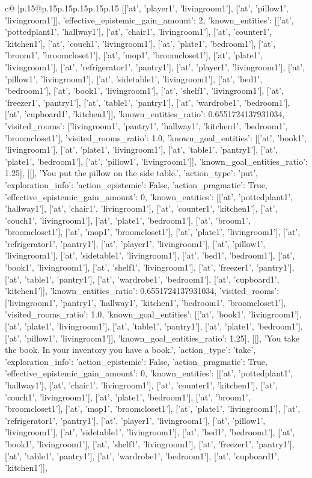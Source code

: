 \documentclass{article}
\begin{document}
{\begin{supertabular}{c@{$\;$}|p{.15\linewidth}@{}p{.15\linewidth}p{.15\linewidth}p{.15\linewidth}p{.15\linewidth}p{.15\linewidth}}
{{{[['at', 'player1', 'livingroom1'], ['at', 'pillow1', 'livingroom1']], 'effective_epistemic_gain_amount': 2, 'known_entities': [['at', 'pottedplant1', 'hallway1'], ['at', 'chair1', 'livingroom1'], ['at', 'counter1', 'kitchen1'], ['at', 'couch1', 'livingroom1'], ['at', 'plate1', 'bedroom1'], ['at', 'broom1', 'broomcloset1'], ['at', 'mop1', 'broomcloset1'], ['at', 'plate1', 'livingroom1'], ['at', 'refrigerator1', 'pantry1'], ['at', 'player1', 'livingroom1'], ['at', 'pillow1', 'livingroom1'], ['at', 'sidetable1', 'livingroom1'], ['at', 'bed1', 'bedroom1'], ['at', 'book1', 'livingroom1'], ['at', 'shelf1', 'livingroom1'], ['at', 'freezer1', 'pantry1'], ['at', 'table1', 'pantry1'], ['at', 'wardrobe1', 'bedroom1'], ['at', 'cupboard1', 'kitchen1']], 'known_entities_ratio': 0.6551724137931034, 'visited_rooms': ['livingroom1', 'pantry1', 'hallway1', 'kitchen1', 'bedroom1', 'broomcloset1'], 'visited_rooms_ratio': 1.0, 'known_goal_entities': [['at', 'book1', 'livingroom1'], ['at', 'plate1', 'livingroom1'], ['at', 'table1', 'pantry1'], ['at', 'plate1', 'bedroom1'], ['at', 'pillow1', 'livingroom1']], 'known_goal_entities_ratio': 1.25}}], [[], 'You put the pillow on the side table.', {'action_type': 'put', 'exploration_info': {'action_epistemic': False, 'action_pragmatic': True, 'effective_epistemic_gain_amount': 0, 'known_entities': [['at', 'pottedplant1', 'hallway1'], ['at', 'chair1', 'livingroom1'], ['at', 'counter1', 'kitchen1'], ['at', 'couch1', 'livingroom1'], ['at', 'plate1', 'bedroom1'], ['at', 'broom1', 'broomcloset1'], ['at', 'mop1', 'broomcloset1'], ['at', 'plate1', 'livingroom1'], ['at', 'refrigerator1', 'pantry1'], ['at', 'player1', 'livingroom1'], ['at', 'pillow1', 'livingroom1'], ['at', 'sidetable1', 'livingroom1'], ['at', 'bed1', 'bedroom1'], ['at', 'book1', 'livingroom1'], ['at', 'shelf1', 'livingroom1'], ['at', 'freezer1', 'pantry1'], ['at', 'table1', 'pantry1'], ['at', 'wardrobe1', 'bedroom1'], ['at', 'cupboard1', 'kitchen1']], 'known_entities_ratio': 0.6551724137931034, 'visited_rooms': ['livingroom1', 'pantry1', 'hallway1', 'kitchen1', 'bedroom1', 'broomcloset1'], 'visited_rooms_ratio': 1.0, 'known_goal_entities': [['at', 'book1', 'livingroom1'], ['at', 'plate1', 'livingroom1'], ['at', 'table1', 'pantry1'], ['at', 'plate1', 'bedroom1'], ['at', 'pillow1', 'livingroom1']], 'known_goal_entities_ratio': 1.25}}], [[], 'You take the book. In your inventory you have a book.', {'action_type': 'take', 'exploration_info': {'action_epistemic': False, 'action_pragmatic': True, 'effective_epistemic_gain_amount': 0, 'known_entities': [['at', 'pottedplant1', 'hallway1'], ['at', 'chair1', 'livingroom1'], ['at', 'counter1', 'kitchen1'], ['at', 'couch1', 'livingroom1'], ['at', 'plate1', 'bedroom1'], ['at', 'broom1', 'broomcloset1'], ['at', 'mop1', 'broomcloset1'], ['at', 'plate1', 'livingroom1'], ['at', 'refrigerator1', 'pantry1'], ['at', 'player1', 'livingroom1'], ['at', 'pillow1', 'livingroom1'], ['at', 'sidetable1', 'livingroom1'], ['at', 'bed1', 'bedroom1'], ['at', 'book1', 'livingroom1'], ['at', 'shelf1', 'livingroom1'], ['at', 'freezer1', 'pantry1'], ['at', 'table1', 'pantry1'], ['at', 'wardrobe1', 'bedroom1'], ['at', 'cupboard1', 'kitchen1']], }}}
\end{supertabular}}
\end{document}
